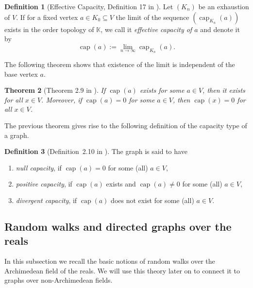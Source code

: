 \documentclass[a4paper,oneside, 12pt]{amsart}
\newtheorem{theorem}{Theorem}
\numberwithin{theorem}{section}
\theoremstyle{definition}
\newtheorem{definition}[theorem]{Definition}
\renewcommand{\c}{\operatorname{cap}}
\newcommand{\K}{\mathbb{K}}
\begin{document}
{\begin{definition}[Effective Capacity, Definition 17 in \cite{Muranova2}]\label{defRT} 
Let $(K_n)$ be an exhaustion of $ V $. If for a fixed vertex $a\in K_0\subseteq V$ the limit of the sequence $(\c_{K_n}(a))$ exists in the order topology of $\K$, we call it \emph{effective capacity of $a$} and denote it by 
$$ 
\c(a) :=\lim_{n\to\infty }\c_{K_n}(a).
$$
\end{definition}

The following theorem shows that existence of the limit is independent of the base vertex $ a $.

\begin{theorem}[Theorem 2.9 in \cite{OurPreprint}]\label{Thm::ind}
 If $ \c(a) $ exists for some $ a\in V $, then it exists for all $ x\in V $. Moreover, if $ \c(a) =0$  for some $ a\in V $, then $ \c(x) =0$  for all $ x\in V $.
\end{theorem}

The previous theorem gives rise to the following definition of the capacity type of a graph.

\begin{definition}[Definition~2.10 in \cite{OurPreprint}]\label{Def::type}
The  graph   is said to have
\begin{enumerate}
\item  
{\em null capacity}, if $\c(a)=0$ for some (all) $a\in V$,
\item 
{\em positive capacity}, if $\c(a)$ exists and $\c(a)\ne 0$ for some (all) $a\in V$,
\item
{\em divergent capacity}, if $\c(a)$ does not exist for some (all) $a\in V$.
\end{enumerate}
\end{definition}





\subsection{Random walks and directed graphs over the reals}
In this subsection we recall the basic notions of random walks over the Archimedean field of the reals. We will use this theory later on to connect it to graphs over non-Archimedean fields.

}
\end{document}
